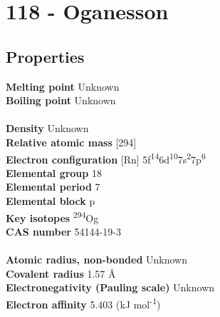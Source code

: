 \section{118 - Oganesson}
\label{sec:elem-oganesson}
\subsection{Properties}
\textbf{Melting point} Unknown\\
\textbf{Boiling point} Unknown\\
\\
\textbf{Density} Unknown\\
\textbf{Relative atomic mass} [294]\\
\textbf{Electron configuration} [Rn] 5f\textsuperscript{14}6d\textsuperscript{10}7s\textsuperscript{2}7p\textsuperscript{6}\\
\textbf{Elemental group} 18\\
\textbf{Elemental period} 7\\
\textbf{Elemental block} p\\
\textbf{Key isotopes} \textsuperscript{294}Og\\
\textbf{CAS number} 54144-19-3\\
\\
\textbf{Atomic radius, non-bonded} Unknown\\
\textbf{Covalent radius} 1.57 Å\\
\textbf{Electronegativity (Pauling scale)} Unknown\\
\textbf{Electron affinity} 5.403 (kJ mol\textsuperscript{-1})\\